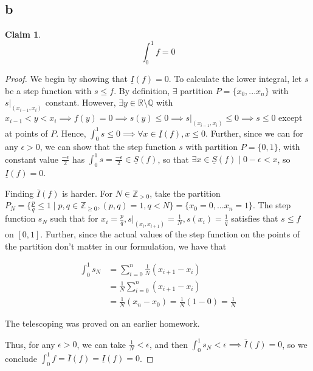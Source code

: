 \documentclass[12pt,letterpaper]{article}
\theoremstyle{definition}
\newtheorem*{claim}{Claim}
\newcommand{\R}{\mathbb{R}}
\newcommand{\Ze}{\mathbb{Z}_{\geq 0}}
\newcommand{\Zg}{\mathbb{Z}_{>0}}
\newcommand{\Q}{\mathbb{Q}}
\begin{document}
\subsection*{b}

\begin{claim}
  \[
    \int_0^1f = 0
  \]
\end{claim}

\begin{proof}
  We begin by showing that $\underline{I}(f) = 0$. To calculate the lower
  integral, let $s$ be a step function with $s \leq f$.
  By definition, $\exists$ partition $P=\{x_0,...x_n\}$ with
  $s|_{(x_{i-1},x_i)}$ constant. However, $\exists y  \in \R \setminus \Q$ with
  $x_{i-1} < y < x_i \implies f(y) = 0 \implies s(y) \leq 0 \implies
  s|_{(x_{i-1},x_i)} \leq 0 \implies s \leq 0$ except at points of $P$. Hence,
  $\int_0^1s \leq 0 \implies \forall x \in \underline{I}(f), x \leq 0$. Further,
  since we can for any $\epsilon > 0$, we can show that the step function $s$ with
  partition $P = \{0,1\}$, with constant value $\frac{-\epsilon}{2}$ has $\int_0^1 s
  = \frac{-\epsilon}{2} \in \underline{S}(f)$, so that $\exists x \in
  \underline{S}(f) \mid 0 - \epsilon < x$, so $\underline{I}(f) = 0$.
 
  Finding $\overline{I}(f)$ is harder. For $N \in \Zg$, take the partition $P_N =
  \{\frac{p}{q} \leq 1 \mid p,q \in \Ze, (p,q) = 1, q < N\} = \{x_0 = 0,...x_n = 1\}$. The step
  function $s_N$ such that for $x_i = \frac{p}{q}, s|_{(x_i,x_{i+1})} =
  \frac{1}{N}, s(x_i) = \frac{1}{q}$ satisfies that $s \leq f$ on $[0,1]$.
  Further, since the actual values of the step function on the points of the
  partition don't matter in our formulation, we have that 

  \begin{align*}
    \int_0^1s_N &= \sum_{i=0}^n\frac{1}{N}(x_{i+1} - x_i) \\
              &= \frac{1}{N}\sum_{i=0}^n(x_{i+1} - x_i) \\
              &= \frac{1}{N}(x_n - x_0) = \frac{1}{N}(1-0) = \frac{1}{N}
  \end{align*}
  
  The telescoping was proved on an earlier homework.
  
  Thus, for any $\epsilon > 0$, we can take $\frac{1}{N} < \epsilon$, and then
  $\int_0^1s_N < \epsilon \implies \overline{I}(f) = 0$, so we conclude
  $\int_0^1f = \overline{I}(f) = \underline{I}(f) = 0$.
\end{proof}
\end{document}

